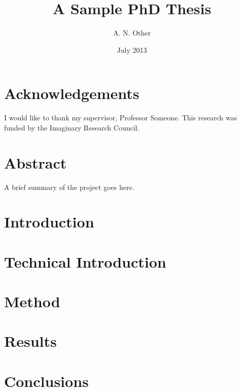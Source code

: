 \documentclass[oneside]{scrbook}
\title{A Sample PhD Thesis}
\author{A. N. Other}
\date{July 2013}
\begin{document}
\maketitle

\frontmatter
\tableofcontents
\listoffigures
\listoftables

\chapter{Acknowledgements}

I would like to thank my supervisor, Professor Someone. This
research was funded by the Imaginary Research Council.

\chapter{Abstract}

A brief summary of the project goes here.

\mainmatter

\chapter{Introduction}
\label{ch:intro}

\chapter{Technical Introduction}
\label{ch:techintro}

\chapter{Method}
\label{ch:method}

\chapter{Results}
\label{ch:results}

\chapter{Conclusions}
\label{ch:conc}

\backmatter


\end{document}
